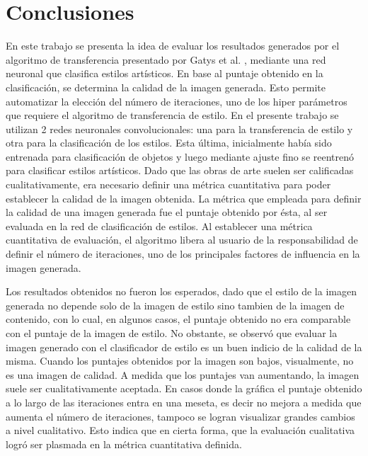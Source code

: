 \documentclass[a4paper,11pt,spanish]{book}
\begin{document}
  \section{Conclusiones}
    En este trabajo se presenta la idea de evaluar los resultados generados por el algoritmo de transferencia presentado por Gatys et al. \cite{Gatys:Neural_Style}, 
    mediante una red neuronal que clasifica estilos artísticos. En base al puntaje obtenido en la clasificación, se determina la calidad de la imagen generada. 
    Esto permite automatizar la elección del número de iteraciones, uno de los hiper parámetros que requiere el algoritmo de transferencia de estilo.
    En el presente trabajo se utilizan 2 redes neuronales convolucionales: una para la transferencia de estilo y otra para la clasificación de los estilos.
    Esta última, inicialmente había sido entrenada para clasificación de objetos y luego mediante ajuste fino se reentrenó para clasificar estilos artísticos.
    Dado que las obras de arte suelen ser calificadas cualitativamente, era necesario definir una métrica cuantitativa para poder establecer la calidad de la imagen obtenida.
    La métrica que empleada para definir la calidad de una imagen generada fue el puntaje obtenido por ésta, al ser evaluada en la red de clasificación de estilos. 
    Al establecer una métrica cuantitativa de evaluación, el algoritmo libera al usuario de la responsabilidad de definir el número de iteraciones, uno de los principales factores 
    de influencia en la imagen generada.
    
    Los resultados obtenidos no fueron los esperados, dado que el estilo de la imagen generada no depende solo de la imagen de estilo sino tambien de la imagen de contenido,
    con lo cual, en algunos casos, el puntaje obtenido no era comparable con el puntaje de la imagen de estilo. 
    No obstante, se observó que evaluar la imagen generado con el clasificador de estilo es un buen indicio de la calidad de la misma. 
    Cuando los puntajes obtenidos por la imagen son bajos, visualmente, no es una imagen de calidad. 
    A medida que los puntajes van aumentando, la imagen suele ser cualitativamente aceptada. 
    En casos donde la gráfica el puntaje obtenido a lo largo de las iteraciones entra en una meseta, es decir no mejora a medida que aumenta el número de iteraciones,
    tampoco se logran visualizar grandes cambios a nivel cualitativo. 
    Esto indica que en cierta forma, que la evaluación cualitativa logró ser plasmada en la métrica cuantitativa definida.
  
\end{document}
